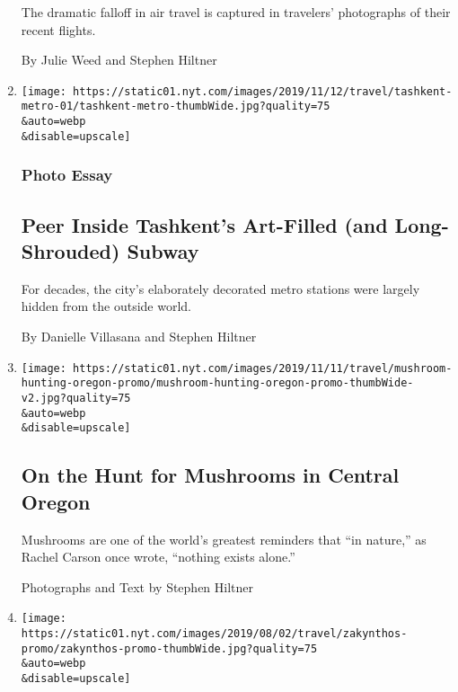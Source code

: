 \begin{enumerate}
  The dramatic falloff in air travel is captured in travelers'
  photographs of their recent flights.

  By Julie Weed and Stephen Hiltner
\item
  \href{/2019/11/20/travel/tashkent-uzbekistan-subway.html}{}

  \texttt{[image: https://static01.nyt.com/images/2019/11/12/travel/tashkent-metro-01/tashkent-metro-thumbWide.jpg?quality=75\\\&auto=webp\\\&disable=upscale]}

  \hypertarget{photo-essay-1}{%
  \subsubsection{Photo Essay}\label{photo-essay-1}}

  \hypertarget{peer-inside-tashkents-art-filled-and-long-shrouded-subway}{%
  \subsection{Peer Inside Tashkent's Art-Filled (and Long-Shrouded)
  Subway}\label{peer-inside-tashkents-art-filled-and-long-shrouded-subway}}

  For decades, the city's elaborately decorated metro stations were
  largely hidden from the outside world.

  By Danielle Villasana and Stephen Hiltner
\item
  \href{/interactive/2019/11/09/multimedia/mushroom-hunting-oregon.html}{}

  \texttt{[image: https://static01.nyt.com/images/2019/11/11/travel/mushroom-hunting-oregon-promo/mushroom-hunting-oregon-promo-thumbWide-v2.jpg?quality=75\\\&auto=webp\\\&disable=upscale]}

  \hypertarget{on-the-hunt-for-mushrooms-in-central-oregon}{%
  \subsection{On the Hunt for Mushrooms in Central
  Oregon}\label{on-the-hunt-for-mushrooms-in-central-oregon}}

  Mushrooms are one of the world's greatest reminders that ``in
  nature,'' as Rachel Carson once wrote, ``nothing exists alone.''

  Photographs and Text by Stephen Hiltner
\item
  \href{/interactive/2019/08/07/multimedia/zakynthos-greece-shipwreck-beaches.html}{}

  \texttt{[image: https://static01.nyt.com/images/2019/08/02/travel/zakynthos-promo/zakynthos-promo-thumbWide.jpg?quality=75\\\&auto=webp\\\&disable=upscale]}


\end{enumerate}
